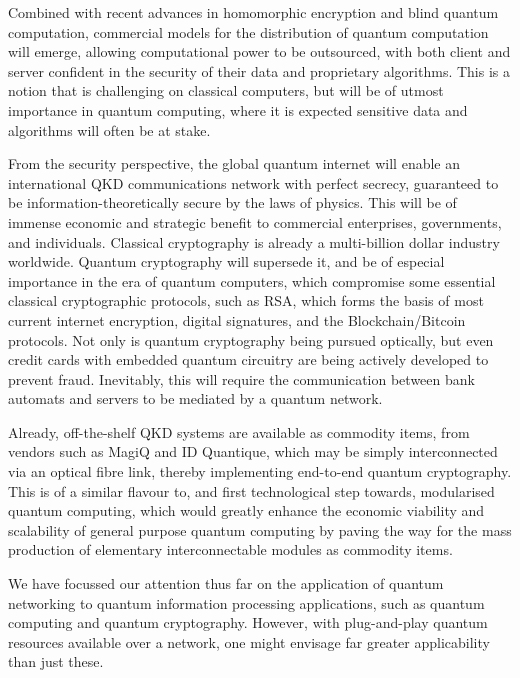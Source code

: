 \documentclass[aps,rmp,twocolumn,amsmath,amssymb,nofootinbib,superscriptaddress,longbibliography,floatfix,table-of-contents,eqsecnum]{revtex4-1}
\begin{document}
Combined with recent advances in homomorphic encryption and blind quantum computation, commercial models for the distribution of quantum computation will emerge, allowing computational power to be outsourced, with both client and server confident in the security of their data and proprietary algorithms. This is a notion that is challenging on classical computers, but will be of utmost importance in quantum computing, where it is expected sensitive data and algorithms will often be at stake.

From the security perspective, the global quantum internet will enable an international QKD communications network with perfect secrecy, guaranteed to be information-theoretically secure by the laws of physics. This will be of immense economic and strategic benefit to commercial enterprises, governments, and individuals. Classical cryptography is already a multi-billion dollar industry worldwide. Quantum cryptography will supersede it, and be of especial importance in the era of quantum computers, which compromise some essential classical cryptographic protocols, such as RSA, which forms the basis of most current internet encryption, digital signatures, and the Blockchain/Bitcoin protocols. Not only is quantum cryptography being pursued optically, but even credit cards with embedded quantum circuitry are being actively developed to prevent fraud. Inevitably, this will require the communication between bank automats and servers to be mediated by a quantum network.

Already, off-the-shelf QKD systems are available as commodity items, from vendors such as MagiQ and ID Quantique, which may be simply interconnected via an optical fibre link, thereby implementing end-to-end quantum cryptography. This is of a similar flavour to, and first technological step towards, modularised quantum computing, which would greatly enhance the economic viability and scalability of general purpose quantum computing by paving the way for the mass production of elementary interconnectable modules as commodity items.

We have focussed our attention thus far on the application of quantum networking to quantum information processing applications, such as quantum computing and quantum cryptography. However, with plug-and-play quantum resources available over a network, one might envisage far greater applicability than just these.
\end{document}
